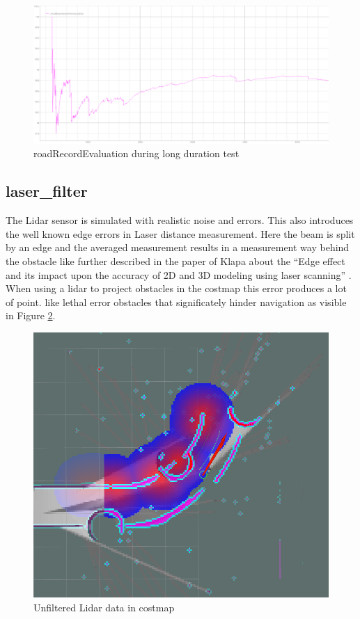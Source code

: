 \begin{figure}[H]
	\includegraphics[width=\textwidth]{Pictures/long duration road detection test}
	\caption{roadRecordEvaluation during long duration test}
	\label{longdurroad}
\end{figure}



\subsection{laser\_filter}


The Lidar sensor is simulated with realistic noise and errors. This also introduces the well known edge errors in Laser distance measurement. Here the beam is split by an edge and the averaged measurement results in a measurement way behind the obstacle like further described in the paper of Klapa about the ``Edge effect and its impact upon the accuracy of 2D and 3D modeling using laser scanning'' \cite{edgeeffect}.\\

When using a lidar to project obstacles in the costmap this error produces a lot of point. like lethal error obstacles that significately hinder navigation as visible in Figure \ref{unfiltered lidar}.

\begin{figure}[H]
	\includegraphics[width=\textwidth]{Pictures/Needs filtering of Laser}
	\caption{Unfiltered Lidar data in costmap}
	\label{unfiltered lidar}
\end{figure}


